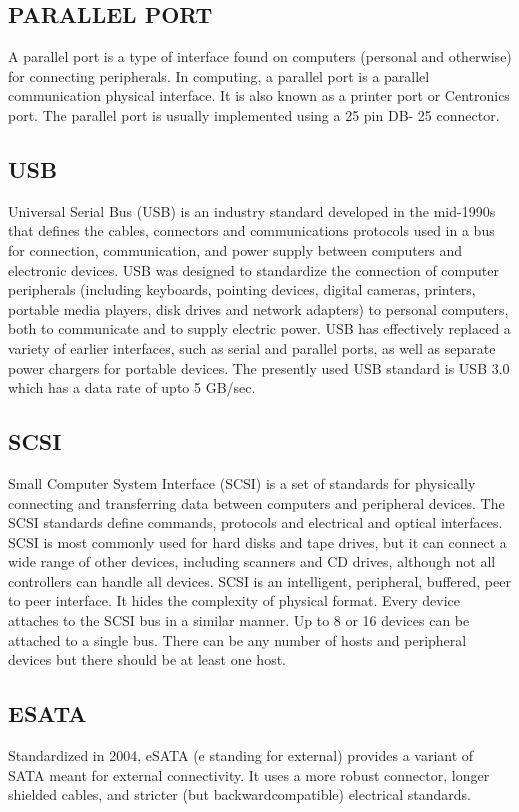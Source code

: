 \documentclass{article}
\begin{document}
\subsection{PARALLEL PORT}
 A parallel port is a type of interface found on computers (personal and otherwise) for
connecting peripherals. In computing, a parallel port is a parallel communication physical interface. It is
also known as a printer port or Centronics port. The parallel port is usually implemented using a 25 pin DB-
25 connector.
\subsection{ USB}
 Universal Serial Bus (USB) is an industry standard developed in the mid-1990s that defines the
cables, connectors and communications protocols used in a bus for connection, communication, and power
supply between computers and electronic devices. USB was designed to standardize the connection
of computer peripherals (including keyboards, pointing devices, digital cameras, printers, portable media
players, disk drives and network adapters) to personal computers, both to communicate and to
supply electric power. USB has effectively replaced a variety of earlier interfaces, such as serial and parallel ports,
as well as separate power chargers for portable devices. The presently used USB standard is USB 3.0 which
has a data rate of upto 5 GB/sec.
\subsection{ SCSI}
 Small Computer System Interface (SCSI) is a set of standards for physically connecting and
transferring data between computers and peripheral devices. The SCSI standards define commands,
protocols and electrical and optical interfaces. SCSI is most commonly used for hard disks and tape drives,
but it can connect a wide range of other devices, including scanners and CD drives, although not all
controllers can handle all devices. SCSI is an intelligent, peripheral, buffered, peer to peer interface. It hides
the complexity of physical format. Every device attaches to the SCSI bus in a similar manner. Up to 8 or 16
devices can be attached to a single bus. There can be any number of hosts and peripheral devices but there
should be at least one host.
\subsection{ ESATA}
 Standardized in 2004, eSATA (e standing for external) provides a variant of SATA meant for
external connectivity. It uses a more robust connector, longer shielded cables, and stricter (but backwardcompatible)
electrical standards.
\end{document}
